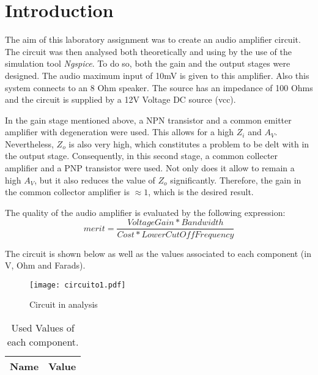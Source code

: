 \section{Introduction}
\label{introduction}


\par The aim of this laboratory assignment was to create an audio amplifier circuit. The circuit was then analysed both theoretically and using by the use of the simulation tool \textit{Ngspice}. To do so, both the gain and the output stages were designed. The audio maximum input of 10mV is given to this amplifier. Also this system connects to an 8 Ohm speaker. The source has an impedance of 100 Ohms and the circuit is supplied by a 12V Voltage DC source (vcc).
\par In the gain stage mentioned above, a NPN transistor and a common emitter amplifier with degeneration were used. This allows for a high $Z_{i}$ and $A_{V}$. Nevertheless, $Z_{o}$ is also very high, which constitutes a problem to be delt with in the output stage. Consequently, in this second stage, a common collecter amplifier and a PNP transistor were used. Not only does it allow to remain a high $A_{V}$, but it also reduces the value of $Z_{o}$ significantly. Therefore, the gain in the common collector amplifier is $\approx 1$, which is the desired result.

\par The quality of the audio amplifier is evaluated by the following expression:
\begin {equation}
	 merit = \frac{Voltage Gain*Bandwidth}{Cost*Lower Cut Off Frequency}   	
	\label{merit}
\end{equation}

The circuit is shown below as well as the values associated to each component (in V, Ohm and Farads).

\begin{figure}[ht]
  \centering
  \texttt{[image: circuito1.pdf]}
  \caption{Circuit in analysis}
  \label{fig:sim4}
\end{figure}


\begin{table}[ht]
  \centering
  \begin{tabular}{|l|r|}
    \hline    
    {\bf Name} & {\bf Value} \\ \hline
  \end{tabular}
  \caption{Used Values of each component.}
  \label{tab:3}
\end{table}


\newpage

